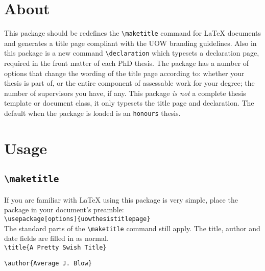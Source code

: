 \documentclass[12pt,oneside]{article}
\newcommand{\option}[1]{\texttt{\color{Green}#1}} %
\newcommand{\command}[1]{\texttt{\color{Red}#1}} %
\newcommand{\comoptions}[1]{\texttt{\color{Blue}#1}} %
\begin{document}
    
\title{}
\author{Thomas M. Griffiths}
\date{Released \today, Version 2.0}

\maketitle

\tableofcontents

\section{About}
This package should be redefines the \command{\textbackslash{}maketitle} command for LaTeX documents and generates a title page compliant with the UOW branding guidelines. Also in this package is a new command \command{\textbackslash{}declaration} which typesets a declaration page, required in the front matter of each PhD thesis. The package has a number of options that change the wording of the title page according to: whether your thesis is part of, or the entire component of assessable work for your degree; the number of supervisors you have, if any. This package \emph{is not} a complete thesis template or document class, it only typesets the title page and declaration. The default when the package is loaded is an \option{honours} thesis.

\section{Usage}
\subsection*{\command{\textbackslash{}maketitle}}
If you are familiar with LaTeX using this package is very simple, place the package in your document's preamble:\\

\command{\textbackslash{}usepackage}\option{[options]}\comoptions{\{uowthesistitlepage\}}\\

\noindent The standard parts of the \command{\textbackslash{}maketitle} command still apply. The title, author and date fields are filled in as normal.\\

\command{\textbackslash{}title}\comoptions{\{A Pretty Swish Title\}}

\command{\textbackslash{}author}\comoptions{\{Average J. Blow\}}
\end{document}
